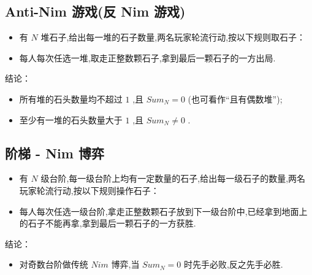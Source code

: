\subsection{Anti-Nim 游戏(反 Nim 游戏)}
\begin{itemize}
    \item 有 $N$ 堆石子,给出每一堆的石子数量,两名玩家轮流行动,按以下规则取石子：

    \item 每人每次任选一堆,取走正整数颗石子,拿到最后一颗石子的一方出局.
    
\end{itemize}

结论：
\begin{itemize}
    \item 所有堆的石头数量均不超过 $1$ ,且 $Sum_N=0$ (也可看作“且有偶数堆”);
    \item 至少有一堆的石头数量大于 $1$ ,且 $Sum_N \neq 0$ .
\end{itemize}


\subsection{阶梯 - Nim 博弈}
\begin{itemize}
    \item 有 $N$ 级台阶,每一级台阶上均有一定数量的石子,给出每一级石子的数量,两名玩家轮流行动,按以下规则操作石子：
    \item 每人每次任选一级台阶,拿走正整数颗石子放到下一级台阶中,已经拿到地面上的石子不能再拿,拿到最后一颗石子的一方获胜.
\end{itemize}

结论：
\begin{itemize}
    \item 对奇数台阶做传统 $Nim$ 博弈,当 $Sum_N=0$ 时先手必败,反之先手必胜.
\end{itemize}



